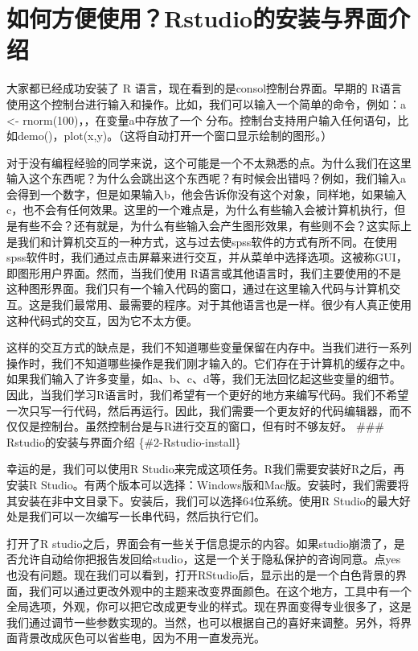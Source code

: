\documentclass[
  oneside]{book}
\begin{document}
\hypertarget{2-Rstudio}{%
\section{如何方便使用？Rstudio的安装与界面介绍}\label{2-Rstudio}}

大家都已经成功安装了 R 语言，现在看到的是consol控制台界面。早期的
R语言使用这个控制台进行输入和操作。比如，我们可以输入一个简单的命令，例如：a \textless- rnorm(100)，，在变量a中存放了一个 分布。控制台支持用户输入任何语句，比如demo()，plot(x,y)。（这将自动打开一个窗口显示绘制的图形。）

对于没有编程经验的同学来说，这个可能是一个不太熟悉的点。为什么我们在这里输入这个东西呢？为什么会跳出这个东西呢？有时候会出错吗？例如，我们输入a会得到一个数字，但是如果输入b，他会告诉你没有这个对象，同样地，如果输入
c，也不会有任何效果。这里的一个难点是，为什么有些输入会被计算机执行，但是有些不会？还有就是，为什么有些输入会产生图形效果，有些则不会？这实际上是我们和计算机交互的一种方式，这与过去使spss软件的方式有所不同。在使用spss软件时，我们通过点击屏幕来进行交互，并从菜单中选择选项。这被称GUI，即图形用户界面。然而，当我们使用 R语言或其他语言时，我们主要使用的不是这种图形界面。我们只有一个输入代码的窗口，通过在这里输入代码与计算机交互。这是我们最常用、最需要的程序。对于其他语言也是一样。很少有人真正使用这种代码式的交互，因为它不太方便。

这样的交互方式的缺点是，我们不知道哪些变量保留在内存中。当我们进行一系列操作时，我们不知道哪些操作是我们刚才输入的。它们存在于计算机的缓存之中。如果我们输入了许多变量，如a、b、c、d等，我们无法回忆起这些变量的细节。因此，当我们学习R语言时，我们希望有一个更好的地方来编写代码。我们不希望一次只写一行代码，然后再运行。因此，我们需要一个更友好的代码编辑器，而不仅仅是控制台。虽然控制台是与R进行交互的窗口，但有时不够友好。
\#\#\# Rstudio的安装与界面介绍 \{\#2-Rstudio-install\}

幸运的是，我们可以使用R Studio来完成这项任务。R我们需要安装好R之后，再安装R Studio。有两个版本可以选择：Windows版和Mac版。安装时，我们需要将其安装在非中文目录下。安装后，我们可以选择64位系统。使用R Studio的最大好处是我们可以一次编写一长串代码，然后执行它们。

打开了R studio之后，界面会有一些关于信息提示的内容。如果studio崩溃了，是否允许自动给你把报告发回给studio，这是一个关于隐私保护的咨询同意。点yes也没有问题。现在我们可以看到，打开RStudio后，显示出的是一个白色背景的界面，我们可以通过更改外观中的主题来改变界面颜色。在这个地方，工具中有一个全局选项，外观，你可以把它改成更专业的样式。现在界面变得专业很多了，这是我们通过调节一些参数实现的。当然，也可以根据自己的喜好来调整。另外，将界面背景改成灰色可以省些电，因为不用一直发亮光。
\end{document}
